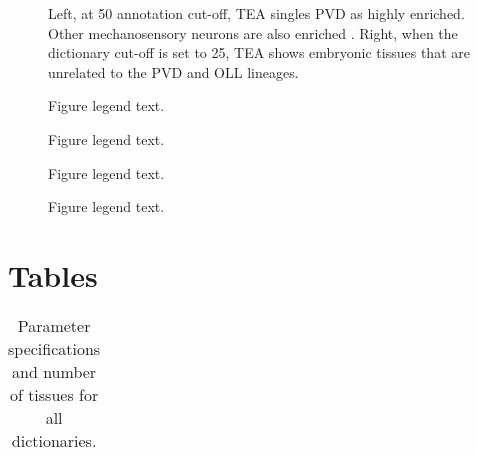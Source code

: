 \documentclass[linenumbers, doublespacing]{bmcart}
\begin{document}
\begin{backmatter}
\begin{figure}[h!]
  \caption{
      Left, at 50 annotation cut-off, TEA singles PVD as highly enriched. Other mechanosensory neurons are also enriched . Right, when the dictionary cut-off is set to 25, TEA shows embryonic tissues that are unrelated to the PVD and OLL lineages.}
	  \label{fig:ovdoll}
      \end{figure}
%
%
%
%
\begin{figure}[h!]
  \caption{
      Figure legend text.}
      \end{figure}
\begin{figure}[h!]
  \caption{
      Figure legend text.}
      \end{figure}
\begin{figure}[h!]
  \caption{
      Figure legend text.}
      \end{figure}
\begin{figure}[h!]
  \caption{
      Figure legend text.}
      \end{figure}


\section*{Tables}
\begin{table}[h!]
\caption{Parameter specifications and number of tissues for all dictionaries.}
      \begin{tabular}{cccc}
        \hline
      \end{tabular}
	  \label{tab:DictionarySpecs}
\end{table}



\end{backmatter}
\end{document}
